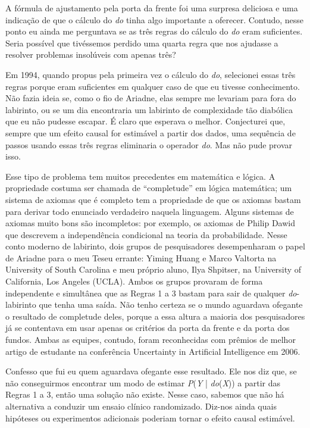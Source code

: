 \documentclass[11pt,a5paper,twoside]{book}
\begin{document}
A fórmula de ajustamento pela porta da frente foi uma surpresa deliciosa e uma indicação de que o cálculo do \textit{do} tinha algo importante a oferecer. Contudo, nesse ponto eu ainda me perguntava se as três regras do cálculo do \textit{do} eram suficientes. Seria possível que tivéssemos perdido uma quarta regra que nos ajudasse a resolver problemas insolúveis com apenas três?

Em 1994, quando propus pela primeira vez o cálculo do \textit{do}, selecionei essas três regras porque eram suficientes em qualquer caso de que eu tivesse conhecimento. Não fazia ideia se, como o fio de Ariadne, elas sempre me levariam para fora do labirinto, ou se um dia encontraria um labirinto de complexidade tão diabólica que eu não pudesse escapar. É claro que esperava o melhor. Conjecturei que, sempre que um efeito causal for estimável a partir dos dados, uma sequência de passos usando essas três regras eliminaria o operador \textit{do}. Mas não pude provar isso.

Esse tipo de problema tem muitos precedentes em matemática e lógica. A propriedade costuma ser chamada de “completude” em lógica matemática; um sistema de axiomas que é completo tem a propriedade de que os axiomas bastam para derivar todo enunciado verdadeiro naquela linguagem. Alguns sistemas de axiomas muito bons são incompletos: por exemplo, os axiomas de Philip Dawid que descrevem a independência condicional na teoria da probabilidade. Nesse conto moderno de labirinto, dois grupos de pesquisadores desempenharam o papel de Ariadne para o meu Teseu errante: Yiming Huang e Marco Valtorta na University of South Carolina e meu próprio aluno, Ilya Shpitser, na University of California, Los Angeles (UCLA). Ambos os grupos provaram de forma independente e simultânea que as Regras 1 a 3 bastam para sair de qualquer \textit{do}-labirinto que tenha uma saída. Não tenho certeza se o mundo aguardava ofegante o resultado de completude deles, porque a essa altura a maioria dos pesquisadores já se contentava em usar apenas os critérios da porta da frente e da porta dos fundos. Ambas as equipes, contudo, foram reconhecidas com prêmios de melhor artigo de estudante na conferência Uncertainty in Artificial Intelligence em 2006.

Confesso que fui eu quem aguardava ofegante esse resultado. Ele nos diz que, se não conseguirmos encontrar um modo de estimar \textit{P}(\textit{Y} | \textit{do}(\textit{X})) a partir das Regras 1 a 3, então uma solução não existe. Nesse caso, sabemos que não há alternativa a conduzir um ensaio clínico randomizado. Diz-nos ainda quais hipóteses ou experimentos adicionais poderiam tornar o efeito causal estimável.
\end{document}
